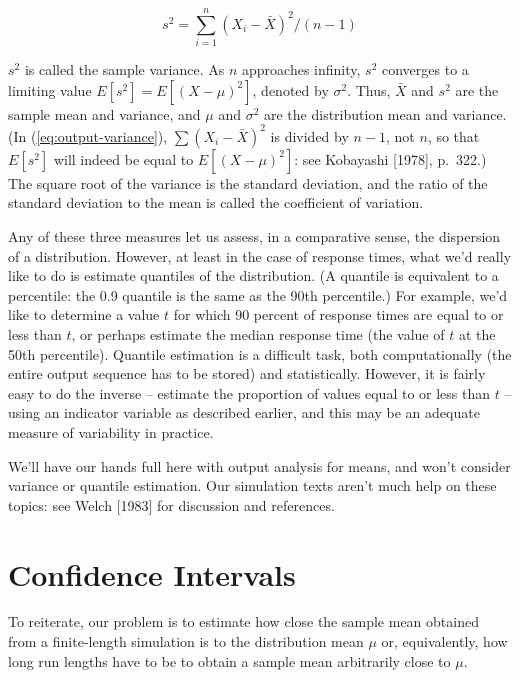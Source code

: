 \begin{equation}
s^2 = \sum_{i=1}^{n} (X_i - \bar{X})^2 / (n - 1)
\label{eq:output-variance}
\end{equation}

$s^2$ is called the sample variance. As $n$ approaches infinity, $s^2$
converges to a limiting value $E[s^2] = E[(X - \mu)^2]$, denoted by $\sigma^2$.
Thus, $\bar{X}$ and $s^2$ are the sample mean and variance, and $\mu$ and
$\sigma^2$ are the distribution mean and variance. (In
(\ref{eq:output-variance}), $\sum (X_i - \bar{X})^2$ is divided by $n - 1$, not
$n$, so that $E[s^2]$ will indeed be equal to $E[(X - \mu)^2]$: see Kobayashi
[1978], p.\ 322.) The square root of the variance is the standard deviation,
and the ratio of the standard deviation to the mean is called the coefficient
of variation.

Any of these three measures let us assess, in a comparative sense, the
dispersion of a distribution. However, at least in the case of response times,
what we'd really like to do is estimate quantiles of the distribution. (A
quantile is equivalent to a percentile: the 0.9 quantile is the same as the
90th percentile.) For example, we'd like to determine a value $t$ for which 90
percent of response times are equal to or less than $t$, or perhaps estimate
the median response time (the value of $t$ at the 50th percentile). Quantile
estimation is a difficult task, both computationally (the entire output
sequence has to be stored) and statistically. However, it is fairly easy to do
the inverse -- estimate the proportion of values equal to or less than $t$ --
using an indicator variable as described earlier, and this may be an adequate
measure of variability in practice.

We'll have our hands full here with output analysis for means, and won't
consider variance or quantile estimation. Our simulation texts aren't much help
on these topics: see Welch [1983] for discussion and references.

\section{Confidence Intervals}
\label{sec:confidence-intervals}

To reiterate, our problem is to estimate how close the sample mean obtained
from a finite-length simulation is to the distribution mean $\mu$ or,
equivalently, how long run lengths have to be to obtain a sample mean
arbitrarily close to $\mu$.

